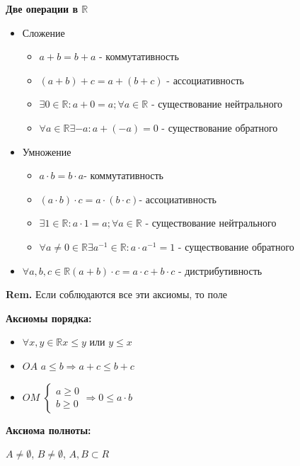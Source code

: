 \documentclass[14pt, letter paper]{article}
\begin{document}
\textbf{Две операции в $\mathds{R}$}
\begin{itemize}
    \item[1.] Сложение
    \begin{itemize}
        \item[$A_1$] $a + b = b + a$ - коммутативность
        \item[$A_2$] $(a + b) + c = a + (b + c)$ - ассоциативность
        \item[$A_3$] $\exists 0 \in \mathds{R} : a + 0 = a; \forall a \in \mathds{R}$ - существование нейтрального
        \item[$A_4$] $\forall a \in \mathds{R} \exists -a : a + (-a) = 0$ - существование обратного
    \end{itemize}
    \item[2.] Умножение
    \begin{itemize}
        \item[$M_1$] $a \cdot b = b \cdot a$- коммутативность
        \item[$M_2$] $(a \cdot b) \cdot c = a \cdot (b \cdot c)$- ассоциативность
        \item[$M_3$] $\exists 1 \in \mathds{R} : a \cdot 1 = a; \forall a \in \mathds{R}$ - существование нейтрального
        \item[$M_4$] $\forall a \neq 0 \in \mathds{R} \exists a^{-1} \in \mathds{R} : a \cdot a^{-1} = 1$ - существование обратного
    \end{itemize}
    \item[$AM$] $\forall a, b, c \in \mathds{R} (a + b) \cdot c = a \cdot c + b \cdot c$ - дистрибутивность
\end{itemize}

\textbf{Rem.} Если соблюдаются все эти аксиомы, то поле

\textbf{Аксиомы порядка:}
\begin{itemize}
    \item $\forall x, y \in \mathds{R} x \leq y$ или $y \leq x$
    \item $OA$ $a \leq b \Rightarrow a + c \leq b + c$
    \item $OM$ $\begin{cases} a \geq 0 \\ b \geq 0 \end{cases} \Rightarrow 0 \leq a \cdot b$
\end{itemize}

\textbf{Аксиома полноты:}

$A \neq \emptyset$, $B \neq \emptyset$, $A, B \subset R$
\end{document}
